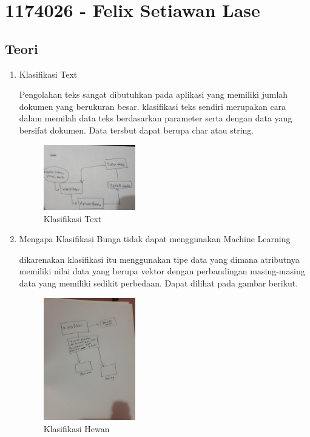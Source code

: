 \section{1174026 - Felix Setiawan Lase}
    \subsection{Teori}
    \begin{enumerate}
        \item Klasifikasi Text
        
        Pengolahan teks sangat dibutuhkan pada aplikasi yang memiliki jumlah dokumen yang berukuran besar. klasifikasi teks sendiri merupakan cara dalam memilah data teks berdasarkan parameter serta dengan data yang bersifat dokumen. Data tersbut dapat berupa char atau string.
        \begin{figure}[H]
            \includegraphics[width=4cm]{figures/1174026/4/klasifikasi.jpg}
            \centering
            \caption{Klasifikasi Text}
        \end{figure}

        \item Mengapa Klasifikasi Bunga tidak dapat menggunakan Machine Learning
        
        dikarenakan klasifikasi itu menggunakan tipe data yang dimana atributnya memiliki nilai data yang berupa vektor dengan perbandingan masing-masing data yang memiliki sedikit perbedaan. Dapat dilihat pada gambar berikut.
        \begin{figure}[H]
            \includegraphics[width=4cm]{figures/1174026/4/hewan.jpeg}
            \centering
            \caption{Klasifikasi Hewan}
        \end{figure}


\end{enumerate}
